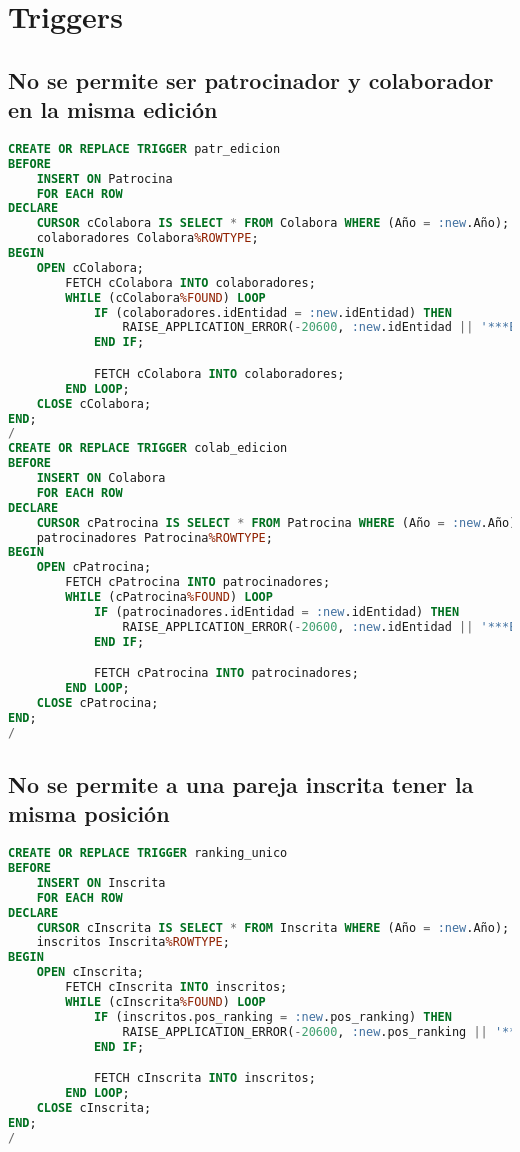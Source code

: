 \section{Triggers}
\subsection{No se permite ser patrocinador y colaborador en la misma edición}
\begin{lstlisting}[language=sql]
CREATE OR REPLACE TRIGGER patr_edicion
BEFORE
    INSERT ON Patrocina
    FOR EACH ROW
DECLARE
    CURSOR cColabora IS SELECT * FROM Colabora WHERE (Año = :new.Año);
    colaboradores Colabora%ROWTYPE;
BEGIN
    OPEN cColabora;
        FETCH cColabora INTO colaboradores;
        WHILE (cColabora%FOUND) LOOP
            IF (colaboradores.idEntidad = :new.idEntidad) THEN
                RAISE_APPLICATION_ERROR(-20600, :new.idEntidad || '***EXCEPTION**** No se puede ser patrocinador y colaborador en la misma edicion');
            END IF;

            FETCH cColabora INTO colaboradores;
        END LOOP;
    CLOSE cColabora;
END;
/
CREATE OR REPLACE TRIGGER colab_edicion
BEFORE
    INSERT ON Colabora
    FOR EACH ROW
DECLARE
    CURSOR cPatrocina IS SELECT * FROM Patrocina WHERE (Año = :new.Año);
    patrocinadores Patrocina%ROWTYPE;
BEGIN
    OPEN cPatrocina;
        FETCH cPatrocina INTO patrocinadores;
        WHILE (cPatrocina%FOUND) LOOP
            IF (patrocinadores.idEntidad = :new.idEntidad) THEN
                RAISE_APPLICATION_ERROR(-20600, :new.idEntidad || '***EXCEPTION**** No se puede ser patrocinador y colaborador en la misma edicion');
            END IF;

            FETCH cPatrocina INTO patrocinadores;
        END LOOP;
    CLOSE cPatrocina;
END;
/
\end{lstlisting}
\subsection{No se permite a una pareja inscrita tener la misma posición}
\begin{lstlisting}[language=sql]
CREATE OR REPLACE TRIGGER ranking_unico
BEFORE
    INSERT ON Inscrita
    FOR EACH ROW
DECLARE
    CURSOR cInscrita IS SELECT * FROM Inscrita WHERE (Año = :new.Año);
    inscritos Inscrita%ROWTYPE;
BEGIN
    OPEN cInscrita;
        FETCH cInscrita INTO inscritos;
        WHILE (cInscrita%FOUND) LOOP
            IF (inscritos.pos_ranking = :new.pos_ranking) THEN
                RAISE_APPLICATION_ERROR(-20600, :new.pos_ranking || '***EXCEPTION**** Esa posicion del ranking ya esta ocupada');
            END IF;

            FETCH cInscrita INTO inscritos;
        END LOOP;
    CLOSE cInscrita;
END;
/
\end{lstlisting}
